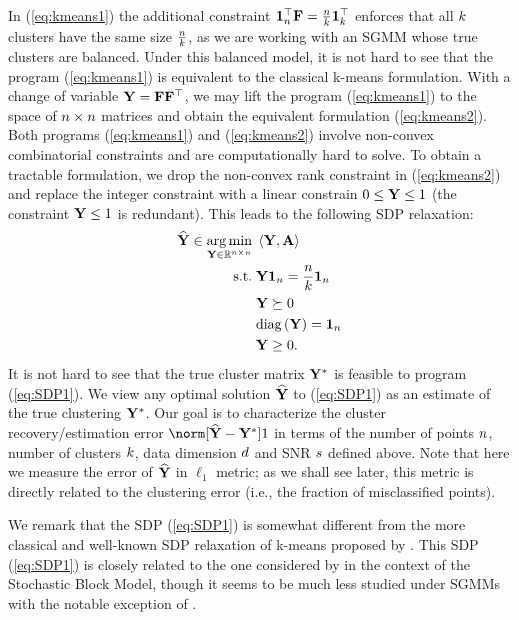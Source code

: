 In (\ref{eq:kmeans1}) the additional constraint $\mathbf{1}_{n}^{\top}\mathbf{F}=\frac{n}{k}\mathbf{1}_{k}^{\top}$
enforces that all $k$ clusters have the same size $\frac{n}{k}$,
as we are working with an SGMM whose true clusters are balanced. Under
this balanced model, it is not hard to see that the program (\ref{eq:kmeans1})
is equivalent to the classical k-means formulation. With a change
of variable $\mathbf{Y}=\mathbf{F}\mathbf{F}^{\top}$, we may lift the program (\ref{eq:kmeans1})
to the space of $n\times n$ matrices and obtain the equivalent
formulation (\ref{eq:kmeans2}). Both programs (\ref{eq:kmeans1})
and (\ref{eq:kmeans2}) involve non-convex combinatorial constraints
and are computationally hard to solve. To obtain a tractable formulation,
we drop the non-convex rank constraint in (\ref{eq:kmeans2}) and
replace the integer constraint with a linear constrain $0\le\mathbf{Y}\le1$
(the constraint $\mathbf{Y}\le1$ is redundant). This leads to the following
SDP relaxation:
\begin{equation}
\begin{aligned}\widehat{\mathbf{Y}}\in\operatorname*{arg\,min}_{\mathbf{Y}\in\mathbb{R}^{n\times n}}\; & \left\langle \mathbf{Y},\mathbf{A}\right\rangle \\
\mbox{s.t.}\; & \mathbf{Y}\mathbf{1}_{n}=\frac{n}{k}\mathbf{1}_{n}\\
 & \mathbf{Y}\succeq0\\
 & \mbox{diag}\left(\mathbf{Y}\right)=\mathbf{1}_{n}\\
 & \mathbf{Y}\ge0.
\end{aligned}
\label{eq:SDP1}
\end{equation}
It is not hard to see that the true cluster matrix $\mathbf{Y}^{*}$ is feasible
to program (\ref{eq:SDP1}). We view any optimal solution $\widehat{\mathbf{Y}}$
to (\ref{eq:SDP1}) as an estimate of the true clustering $\mathbf{Y}^{*}$.
Our goal is to characterize the cluster recovery/estimation error
$\norm[\Yhat-\Ystar]1$ in terms of the number of points $n$,
number of clusters $k$, data dimension $d$ and SNR
$s$ defined above. Note that here we measure the error of $\widehat{\mathbf{Y}}$
in $\ell_{1}$ metric; as we shall see later, this metric is directly
related to the clustering error (i.e., the fraction of misclassified
points).

We remark that the SDP (\ref{eq:SDP1}) is somewhat different from
the more classical and well-known SDP relaxation of k-means proposed
by \citet{peng2007approximating}. This SDP (\ref{eq:SDP1}) is closely
related to the one considered by \citet{amini2014semidefinite} in
the context of the Stochastic Block Model, though it seems to be much
less studied under SGMMs with the notable exception of \citet{li2017kmeans}.

